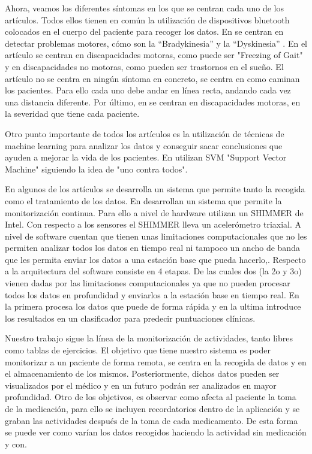 \documentclass[11pt,spanish]{article}
\begin{document}
Ahora, veamos los diferentes síntomas en los que se centran cada uno de los artículos. Todos ellos tienen en común la utilización de dispositivos bluetooth colocados en el cuerpo del paciente para recoger los datos. En \cite{resumen1} se centran en detectar problemas motores, cómo son la “Bradykinesia” \cite{Hipocinesia} y la “Dyskinesia” \cite{Dyskinesia}. En el artículo \cite{resumen2} se centran en discapacidades motoras, como puede ser "Freezing of Gait" \cite{Gait} y en discapacidades no motoras, como pueden ser trastornos en el sueño. El artículo \cite{resumen3} no se centra en ningún síntoma en concreto, se centra en como caminan los pacientes. Para ello cada uno debe andar en línea recta, andando cada vez una distancia diferente. Por último, en \cite{resumen4} se centran en discapacidades motoras, en la severidad que tiene cada paciente.
\newline

Otro punto importante de todos los artículos es la utilización de técnicas de machine learning para analizar los datos y conseguir sacar conclusiones que ayuden a mejorar la vida de los pacientes. En \cite{resumen4} utilizan SVM "Support Vector Machine" \cite{SVM} siguiendo la idea de "uno contra todos".
\newline

En algunos de los artículos se desarrolla un sistema que permite tanto la recogida como el tratamiento de los datos. En \cite{resumen1} desarrollan un sistema que permite la monitorización continua. Para ello a nivel de hardware utilizan un SHIMMER de Intel. Con respecto a los sensores el SHIMMER lleva un acelerómetro triaxial. A nivel de software cuentan que tienen unas limitaciones computacionales que no les permiten analizar todos los datos en tiempo real ni tampoco un ancho de banda que les permita enviar los datos a una estación base que pueda hacerlo,. Respecto a la arquitectura del software consiste en 4 etapas. De las cuales dos (la 2o y 3o) vienen dadas por las limitaciones computacionales ya que no pueden procesar todos los
datos en profundidad y enviarlos a la estación base en tiempo real. En la primera procesa los datos que puede de forma rápida y en la ultima introduce los resultados en un clasificador para predecir puntuaciones clínicas.
\newline

Nuestro trabajo sigue la línea de la monitorización de actividades, tanto libres como tablas de ejercicios. El objetivo que tiene nuestro sistema es poder monitorizar a un paciente de forma remota, se centra en la recogida de datos y en el almacenamiento de los mismos. Posteriormente, dichos datos pueden ser visualizados por el médico y en un futuro podrán ser analizados en mayor profundidad. Otro de los objetivos, es observar como afecta al paciente la toma de la medicación, para ello se incluyen recordatorios dentro de la aplicación y se graban las actividades después de la toma de cada medicamento. De esta forma se puede ver como varían los datos recogidos haciendo la actividad sin medicación y con.
\newpage
\end{document}
